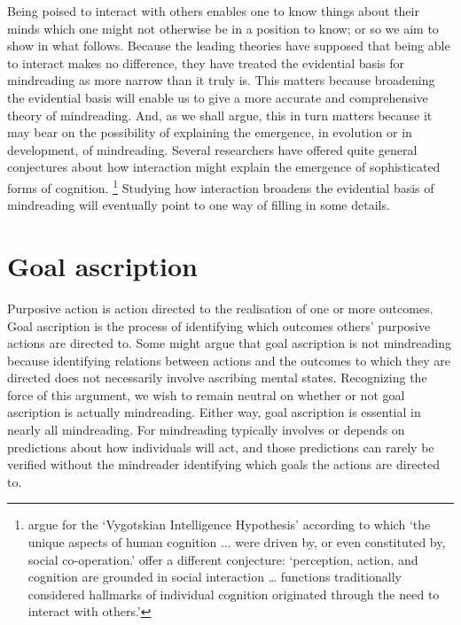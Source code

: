 \documentclass[14pt,a4paper]{extarticle}
\begin{document}
Being poised to interact with others enables one to know things about their minds which one might not otherwise be in a position to know; or so we aim to show in what follows.
Because the leading theories have supposed that being able to interact makes no difference,
they have treated the evidential basis for mindreading as more narrow than it truly is.
This matters because broadening the evidential basis will enable us to give a more accurate and comprehensive theory of mindreading.
And, as we shall argue, this in turn matters because it may bear on the possibility of explaining the emergence, in evolution or in development, of mindreading.
Several researchers have offered quite general conjectures about how interaction might explain the emergence of sophisticated forms of cognition.%
\footnote{
\citet[p.\ 1]{Moll:2007gu}
argue for the `Vygotskian Intelligence Hypothesis' according to which `the unique aspects of human cognition ... were driven by, or even constituted by, social co-operation.'
\citet[p.\ 103]{Knoblich:2006bn} offer a different conjecture:
`perception, action, and cognition are grounded in social interaction  … functions traditionally considered hallmarks of individual cognition originated through the need to interact with others.'
}
Studying how interaction broadens the evidential basis of mindreading will eventually point to one way of filling in some details.




\section{Goal ascription}
Purposive action is action directed to the realisation of one or more outcomes.
Goal ascription is the process of identifying which outcomes others' purposive actions are directed to.
Some might argue that goal ascription is not mindreading because 
identifying relations between actions and the outcomes to which they are directed
does not necessarily involve ascribing mental states.
Recognizing the force of this argument,
we wish to remain neutral on whether or not goal ascription is actually mindreading.
Either way,
goal ascription is essential in nearly all mindreading.
For mindreading typically involves or depends on predictions about how individuals will act,
and those predictions can rarely be verified without the mindreader identifying which goals the actions are directed to.
\end{document}
